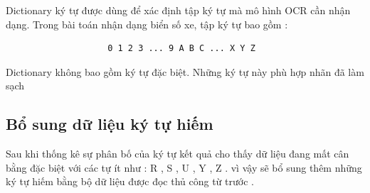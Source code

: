 \documentclass[13pt,a4paper]{report}
\begin{document}
Dictionary ký tự được dùng để xác định tập ký tự mà mô hình OCR cần nhận dạng. Trong bài toán nhận dạng biển số xe, tập ký tự bao gồm : 
\begin{verbatim}
	                0 1 2 3 ... 9 A B C ... X Y Z
\end{verbatim} 

Dictionary không bao gồm ký tự đặc biệt. Những ký tự này phù hợp nhãn đã làm sạch

\subsection{Bổ sung dữ liệu ký tự hiếm}

Sau khi thống kê sự phân bố của ký tự kết quả cho thấy dữ liệu đang mất cân bằng đặc biệt với các tự ít như : R , S , U , Y , Z . vì vậy sẽ bổ sung thêm những ký tự hiếm bằng bộ dữ liệu được đọc thủ công từ trước  .
\end{document}

